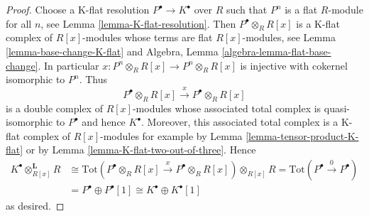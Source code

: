 \documentclass[10pt,a4paper]{amsart}
\theoremstyle{plain}
\theoremstyle{definition}
\theoremstyle{remark}
\numberwithin{equation}{subsection}
\begin{document}
\begin{proof}
Choose a K-flat resolution $P^\bullet \to K^\bullet$ over $R$
such that $P^n$ is a flat $R$-module for all $n$, see
Lemma \ref{lemma-K-flat-resolution}. Then $P^\bullet \otimes_R R[x]$
is a K-flat complex of $R[x]$-modules whose terms are flat $R[x]$-modules, see
Lemma \ref{lemma-base-change-K-flat} and
Algebra, Lemma \ref{algebra-lemma-flat-base-change}.
In particular $x : P^n \otimes_R R[x] \to P^n \otimes_R R[x]$
is injective with cokernel isomorphic to $P^n$. Thus
$$
P^\bullet \otimes_R R[x] \xrightarrow{x} P^\bullet \otimes_R R[x]
$$
is a double complex of $R[x]$-modules whose associated
total complex is quasi-isomorphic to $P^\bullet$ and hence $K^\bullet$.
Moreover, this associated total complex is a K-flat complex
of $R[x]$-modules for example by
Lemma \ref{lemma-tensor-product-K-flat} or by
Lemma \ref{lemma-K-flat-two-out-of-three}.
Hence
\begin{align*}
K^\bullet \otimes_{R[x]}^{\mathbf{L}} R
& \cong
\text{Tot}(P^\bullet \otimes_R R[x] \xrightarrow{x} P^\bullet \otimes_R R[x])
\otimes_{R[x]} R =
\text{Tot}(P^\bullet \xrightarrow{0} P^\bullet) \\
& = P^\bullet \oplus P^\bullet[1] \cong K^\bullet \oplus K^\bullet[1]
\end{align*}
as desired.
\end{proof}
\end{document}
